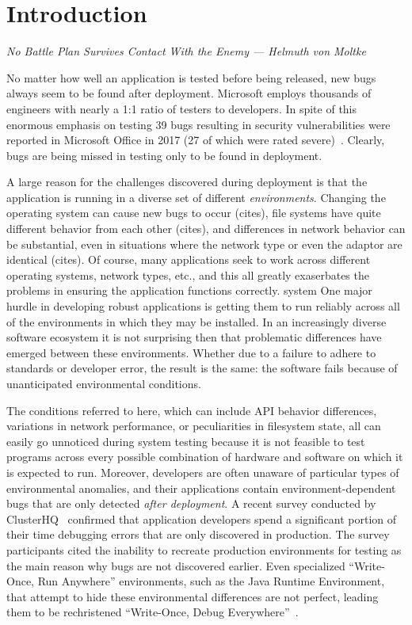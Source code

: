 \section{Introduction}

\textit{No Battle Plan Survives Contact With the Enemy --- Helmuth von Moltke}

No matter how well an application is tested before being released, new 
bugs always seem to be found after deployment.
Microsoft employs thousands of engineers with nearly a 1:1 ratio of testers to
developers\cite{Page2009}.  In spite of this enormous emphasis on testing 39
bugs resulting in security vulnerabilities were reported in Microsoft Office in
2017 (27 of which were rated severe)~\cite{OfficeBugs2017}.  Clearly, bugs are
being missed in testing only to be found in deployment.

A large reason for the challenges discovered during deployment is that the 
application is running in a diverse set of different \emph{environments}.  
Changing the operating system can cause new bugs to occur (cites), file
systems have quite different behavior from each other (cites), and differences
in network behavior can be substantial, even in situations where the network
type or even the adaptor are identical (cites).  Of course, many applications
seek to work across different operating systems, network types, etc., and this
all greatly exaserbates the problems in ensuring the application functions
correctly.
system
One major hurdle in developing robust applications is getting them to
run reliably across all of the environments in which they may be
installed.  In an increasingly diverse software ecosystem it is not
surprising then that problematic differences have emerged between these
environments.  Whether due to a failure to adhere to 
standards or developer error, the result is the same: the software 
fails because of unanticipated environmental conditions.

The conditions referred to here, which can include API behavior
differences, variations in network performance, or peculiarities in
filesystem state, all
can easily go unnoticed
during system testing because it is not feasible to
test programs 
across every possible combination of hardware and software on which it
is expected to run. Moreover, developers are often unaware
of particular types of environmental anomalies, and their
applications contain environment-dependent bugs that are only
detected \emph{after deployment}. A recent survey conducted by
ClusterHQ~\cite{ClusterHQSurvey} confirmed that application developers
spend a significant portion of their time debugging errors that are only discovered
in production.  The survey participants cited the inability to
recreate production environments for testing as the main reason why
bugs are not discovered earlier.
Even specialized ``Write-Once, Run Anywhere'' environments, such as the Java 
Runtime Environment, that attempt to hide these environmental differences are 
not perfect, leading them to be rechristened ``Write-Once, Debug 
Everywhere''~\cite{WODE}.

